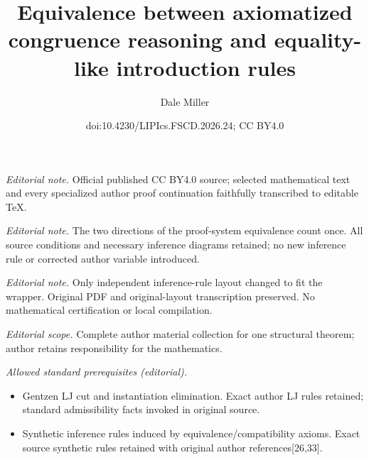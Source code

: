 \documentclass[10pt,a4paper]{article}
\title{Equivalence between axiomatized congruence reasoning and equality-like introduction rules}
\author{Dale Miller}
\date{doi:10.4230/LIPIcs.FSCD.2026.24; CC BY4.0}
\begin{document}
\maketitle
\noindent\textit{Editorial note.} Official published CC BY4.0 source; selected mathematical text and every specialized author proof continuation faithfully transcribed to editable TeX.\par\medskip
\noindent\textit{Editorial note.} The two directions of the proof-system equivalence count once. All source conditions and necessary inference diagrams retained; no new inference rule or corrected author variable introduced.\par\medskip
\noindent\textit{Editorial note.} Only independent inference-rule layout changed to fit the wrapper. Original PDF and original-layout transcription preserved. No mathematical certification or local compilation.\par\medskip
\noindent\textit{Editorial scope.} Complete author material collection for one structural theorem; author retains responsibility for the mathematics.\par\medskip
\noindent\textit{Allowed standard prerequisites (editorial).}\begin{itemize}
\item Gentzen LJ cut and instantiation elimination. Exact author LJ rules retained; standard admissibility facts invoked in original source.
\item Synthetic inference rules induced by equivalence/compatibility axioms. Exact source synthetic rules retained with original author references[26,33].
\end{itemize}\medskip
\end{document}
